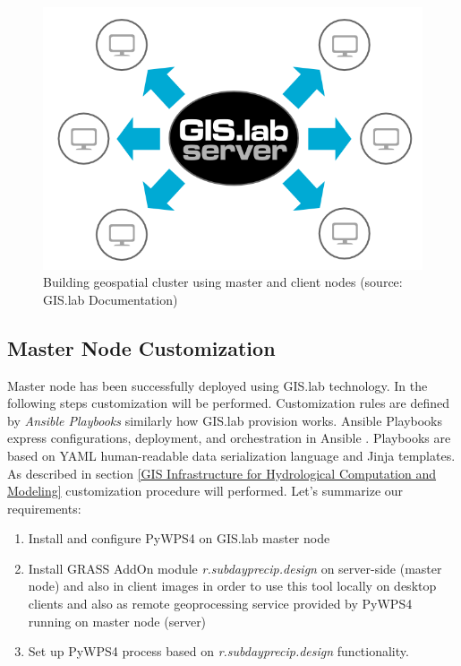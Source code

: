 \documentclass{isprs}
\begin{document}
\begin{figure}[ht!]
\begin{center}
  \includegraphics[width=1.0\columnwidth]{figures/gislab-machines-launch.png}
  \caption{Building geospatial cluster using master and client nodes
    (source: GIS.lab Documentation)}
\label{fig:gislab_infrastructure}
\end{center}
\end{figure}

\subsection{Master Node Customization}

Master node has been successfully deployed using GIS.lab
technology. In the following steps customization will be
performed. Customization rules are defined by \textit{Ansible
  Playbooks} similarly how GIS.lab provision works. Ansible Playbooks
express configurations, deployment, and orchestration in Ansible
\cite{shah2015ansible}. Playbooks are based on YAML human-readable
data serialization language and Jinja templates. As described in
section \ref{GIS Infrastructure for Hydrological Computation and
  Modeling} customization procedure will performed. Let's summarize
our requirements:

\begin{enumerate}
\setlength\itemsep{0em}\setlength\parskip{0em}\setlength\topsep{0em}\setlength\partopsep{0em}\setlength\parsep{0em}
\item{Install and configure PyWPS4 on GIS.lab master node}
\item{Install GRASS AddOn module \textit{r.subdayprecip.design} on
    server-side (master node) and also in client images in order to
    use this tool locally on desktop clients and also as remote
    geoprocessing service provided by PyWPS4 running on master node
    (server)}
\item{Set up PyWPS4 process based on \textit{r.subdayprecip.design}
  functionality.}
\end{enumerate}
\end{document}
